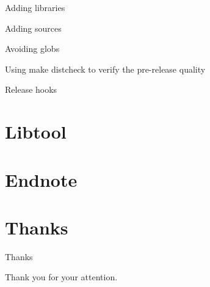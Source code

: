 \documentclass{beamer}
\begin{document}
Adding libraries

Adding sources

Avoiding globs

Using make distcheck to verify the pre-release quality

Release hooks

\section{Libtool}

\section{Endnote}

\section{Thanks}

\begin{frame}{Thanks}
	\begin{center}
	Thank you for your attention.
	\end{center}
\end{frame}
\end{document}
